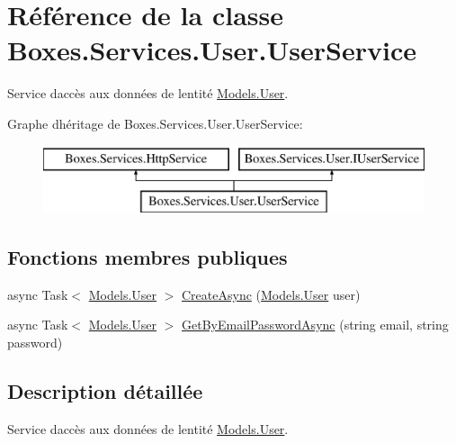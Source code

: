 \hypertarget{class_boxes_1_1_services_1_1_user_1_1_user_service}{}\section{Référence de la classe Boxes.\+Services.\+User.\+User\+Service}
\label{class_boxes_1_1_services_1_1_user_1_1_user_service}


Service d\textquotesingle{}accès aux données de l\textquotesingle{}entité \hyperlink{class_boxes_1_1_models_1_1_user}{Models.\+User}.  


Graphe d\textquotesingle{}héritage de Boxes.\+Services.\+User.\+User\+Service\+:\begin{figure}[H]
\begin{center}
\leavevmode
\includegraphics[height=2.000000cm]{class_boxes_1_1_services_1_1_user_1_1_user_service}
\end{center}
\end{figure}
\subsection*{Fonctions membres publiques}
\begin{DoxyCompactItemize}
\item 
async Task$<$ \hyperlink{class_boxes_1_1_models_1_1_user}{Models.\+User} $>$ \hyperlink{class_boxes_1_1_services_1_1_user_1_1_user_service_a16cddcf857e84cbe91e6080a0c069ea6}{Create\+Async} (\hyperlink{class_boxes_1_1_models_1_1_user}{Models.\+User} user)
\item 
async Task$<$ \hyperlink{class_boxes_1_1_models_1_1_user}{Models.\+User} $>$ \hyperlink{class_boxes_1_1_services_1_1_user_1_1_user_service_a78cf446a883eba4bef411c128794a624}{Get\+By\+Email\+Password\+Async} (string email, string password)
\end{DoxyCompactItemize}


\subsection{Description détaillée}
Service d\textquotesingle{}accès aux données de l\textquotesingle{}entité \hyperlink{class_boxes_1_1_models_1_1_user}{Models.\+User}. 



